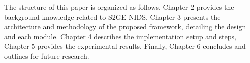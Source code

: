 \begin{ZhChapter}
    The structure of this paper is organized as follows. Chapter 2 provides the background knowledge related to S2GE-NIDS. Chapter 3 presents the architecture and methodology of the proposed framework, detailing the design and each module. Chapter 4 describes the implementation setup and steps, Chapter 5 provides the experimental results. Finally, Chapter 6 concludes and outlines for future research.



\end{ZhChapter}